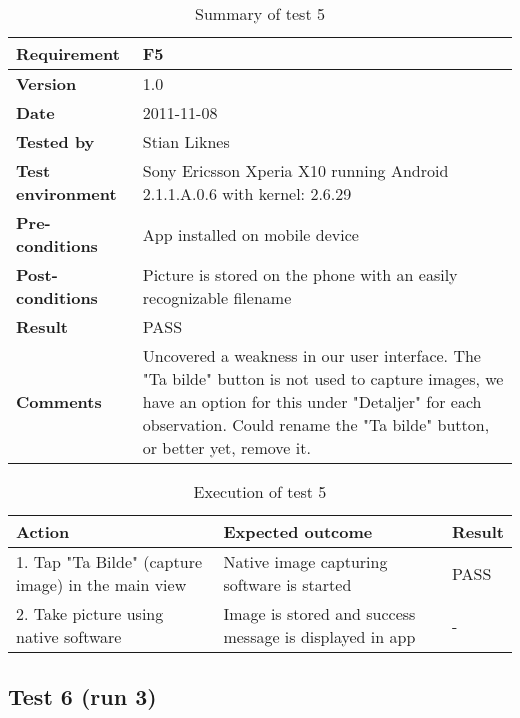 	\begin{table}[htb]
		\centering
		\begin{tabular}{|p{3.5cm}|p{7.0cm}|} \hline
			\textbf{Requirement} & F5 \\ \hline
			\textbf{Version} & 1.0 \\ \hline
			\textbf{Date} & 2011-11-08 \\ \hline
			\textbf{Tested by} & Stian Liknes \\ \hline
			\textbf{Test environment} & Sony Ericsson Xperia X10 running Android 2.1.1.A.0.6 with kernel: 2.6.29 \\ \hline
			\textbf{Pre-conditions} & App installed on mobile device \\ \hline
			\textbf{Post-conditions} & Picture is stored on the phone with an easily recognizable filename \\ \hline
			\textbf{Result} & PASS \\ \hline
			\textbf{Comments} & Uncovered a weakness in our user interface. The
			"Ta bilde" button is not used to capture images, we have an option
			for this under "Detaljer" for each observation. Could rename the
				"Ta bilde" button, or better yet, remove it.\\ \hline
		\end{tabular}
		\caption{Summary of test 5}
	\end{table}

	\begin{table}[htb]
		\centering
		\begin{tabular}{|p{5.0cm}|p{5.0cm}|p{1cm}|}
			\hline \textbf{Action} & \textbf{Expected outcome} & \textbf{Result} \\ \hline
			1. Tap "Ta Bilde" (capture image) in the main view &
			Native image capturing software is started & 
			PASS \\ \hline

			2. Take picture using native software &
			Image is stored and success message is displayed in app &
			- \\ \hline
		\end{tabular}
		\caption{Execution of test 5}
	\end{table}

\newpage
\subsection*{Test 6 (run 3)}

